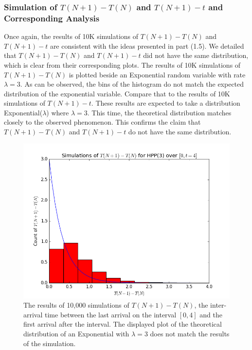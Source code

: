 \documentclass[11pt, oneside]{article}   	%
\begin{document}
\subsubsection{Simulation of $T(N+1)-T(N)$ and $T(N+1)-t$ and Corresponding Analysis}
Once again, the results of 10K simulations of $T(N+1)-T(N)$ and $T(N+1)-t$ are consistent with the ideas presented in part (1.5). We detailed that $T(N+1)-T(N)$ and $T(N+1)-t$ did not have the same distribution, which is clear from their corresponding plots. The results of 10K simulations of $T(N+1)-T(N)$ is plotted beside an Exponential random variable with rate $\lambda=3$. As can be observed, the bins of the histogram do not match the expected distribution of the exponential variable. Compare that to the results of 10K simulations of $T(N+1)-t$. These results are expected to take a distribution Exponential($\lambda$) where $\lambda=3$. This time, the theoretical distribution matches closely to the observed phenomenon. This confirms the claim that $T(N+1)-T(N)$ and $T(N+1)-t$ do not have the same distribution.
\begin{figure}[H]
\includegraphics[scale=.45]{hpp_tn1_tn}
\caption{The results of 10,000 simulations of $T(N+1)-T(N)$, the inter-arrival time between the last arrival on the interval $[0,4]$ and the first arrival after the interval. The displayed plot of the theoretical distribution of an Exponential with $\lambda=3$ does not match the results of the simulation.}
\label{fig:x}
\end{figure}
\end{document}
